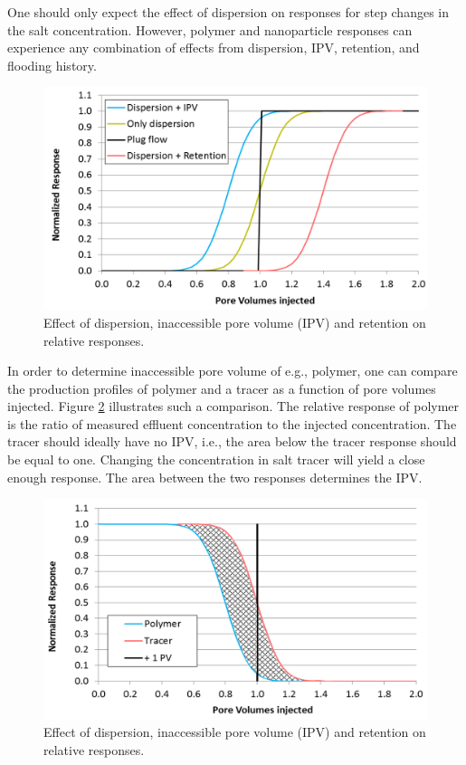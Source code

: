 One should only expect the effect of dispersion on responses for step changes in the salt concentration. However, polymer and nanoparticle responses can experience any combination of effects from dispersion, IPV, retention, and flooding history.

\begin{figure}[h!]
    \centering
    \includegraphics[width=\textwidth]{img/fig/ipvRet1.png}
    \caption{Effect of dispersion, inaccessible pore volume (IPV) and retention on relative responses.}
    \label{fig:ipvRet1} %
\end{figure}

In order to determine inaccessible pore volume of e.g., polymer, one can compare the production profiles of polymer and a tracer as a function of pore volumes injected. Figure \ref{fig:ipvRet2} illustrates such a comparison. The relative response of polymer is the ratio of measured effluent concentration to the injected concentration. The tracer should ideally have no IPV, i.e., the area below the tracer response should be equal to one. Changing the concentration in salt tracer will yield a close enough response. The area between the two responses determines the IPV.

\begin{figure}[h!]
    \centering
    \includegraphics[width=\textwidth]{img/fig/ipvRet2.png}
    \caption{Effect of dispersion, inaccessible pore volume (IPV) and retention on relative responses.}
    \label{fig:ipvRet2} %
\end{figure}

